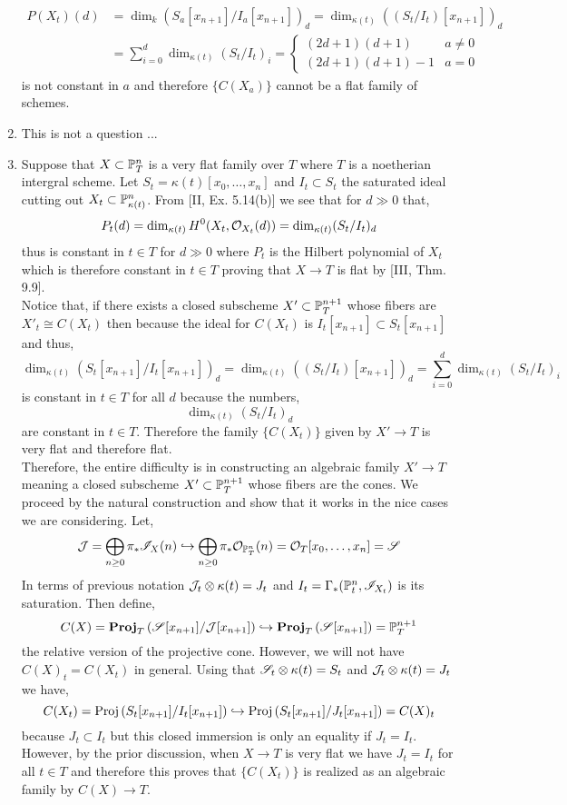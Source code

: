 \documentclass[12pt]{article}
\begin{document}
\begin{enumerate}
\begin{align*}
P(X_t)(d) & = \dim_{k} (S_a[x_{n+1}]/I_a[x_{n+1}])_d = \dim_{\kappa(t)} ((S_t/I_t)[x_{n+1}])_d
\\
& = \sum_{i = 0}^d \dim_{\kappa(t)} (S_t/I_t)_{i} = 
\begin{cases}
(2 d + 1)(d + 1) & a \neq 0
\\
(2 d + 1)(d + 1) - 1 & a = 0
\end{cases}
\end{align*}
is not constant in $a$ and therefore $\{ C(X_a) \}$ cannot be a flat family of schemes.

\item This is not a question ... 

\item Suppose that $X \subset \P^n_T$ is a very flat family over $T$ where $T$ is a noetherian intergral scheme.  Let $S_t = \kappa(t)[x_0, \dots, x_n]$ and $I_t \subset S_t$ the saturated ideal cutting out $X_t \subset \P^n_{\kappa(t)}$. 
From [II, Ex. 5.14(b)] we see that for $d \gg 0$ that,
\[ P_t(d) = \dim_{\kappa(t)} H^0(X_t, \struct{X_t}(d)) = \dim_{\kappa(t)} (S_t / I_t)_d \]
thus is constant in $t \in T$ for $d \gg 0$ where $P_t$ is the Hilbert polynomial of $X_t$ which is therefore constant in $t \in T$ proving that $X \to T$ is flat by [III, Thm. 9.9].
\bigskip\\
Notice that, if there exists a closed subscheme $X' \subset \P^{n+1}_T$ whose fibers are $X'_t \cong C(X_t)$ then because the ideal for $C(X_t)$ is $I_t[x_{n+1}] \subset S_t[x_{n+1}]$ and thus,
\[ \dim_{\kappa(t)} (S_t[x_{n+1}]/I_t[x_{n+1}])_d = \dim_{\kappa(t)} ((S_t/I_t)[x_{n+1}])_d = \sum_{i = 0}^d \dim_{\kappa(t)} (S_t/I_t)_{i} \]
is constant in $t \in T$ for all $d$ because the numbers,
\[ \dim_{\kappa(t)} (S_t/I_t)_{d} \]
are constant in $t \in T$. Therefore the family $\{ C(X_t) \}$ given by $X' \to T$ is very flat and therefore flat. 
\bigskip\\
Therefore, the entire difficulty is in constructing an algebraic family $X' \to T$ meaning a closed subscheme $X' \subset \P^{n+1}_T$ whose fibers are the cones. We proceed by the natural construction and show that it works in the nice cases we are considering. Let,
\[ \J = \bigoplus_{n \ge 0} \pi_* \I_X(n) \embed \bigoplus_{n \ge 0} \pi_* \struct{\P^n_T}(n) = \struct{T}[x_0, \dots, x_n] = \sS \] 
In terms of previous notation $\J_t \ot \kappa(t) = J_t$ and $I_t = \Gamma_*(\P^n_t, \I_{X_t})$ is its saturation. Then define,
\[ C(X) = \rProj{T}{\sS[x_{n+1}]/\J[x_{n+1}]} \embed \rProj{T}{\sS[x_{n+1}]} = \P^{n+1}_T \]
the relative version of the projective cone. However, we will not have $C(X)_t = C(X_t)$ in general. Using that $\sS_t \ot \kappa(t) = S_t$ and $\J_t \ot \kappa(t) = J_t$ we have,
\[ C(X_t) = \Proj{S_t[x_{n+1}]/I_t[x_{n+1}]} \embed \Proj{S_t[x_{n+1}]/J_t[x_{n+1}]} = C(X)_t \]
because $J_t \subset I_t$ but this closed immersion is only an equality if $J_t = I_t$. However, by the prior discussion, when $X \to T$ is very flat we have $J_t = I_t$ for all $t \in T$ and therefore this proves that $\{ C(X_t) \}$ is realized as an algebraic family by $C(X) \to T$.


\end{enumerate}
\end{document}
